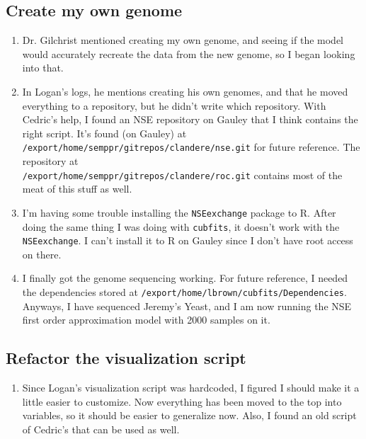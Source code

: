 \documentclass[12 pt]{article}
\begin{document}
 		\subsection{Create my own genome}
 		\begin{enumerate}
 			\item Dr. Gilchrist mentioned creating my own genome, and seeing if the model would accurately recreate the data from the new genome, so I began looking into that.
 			\item In Logan's logs, he mentions creating his own genomes, and that he moved everything to a repository, but he didn't write which repository. With Cedric's help, I found an NSE repository on Gauley that I think contains the right script. It's found (on Gauley) at \\
 			\texttt{/export/home/semppr/gitrepos/clandere/nse.git} for future reference. The repository at \\
 			\texttt{/export/home/semppr/gitrepos/clandere/roc.git} contains most of the meat of this stuff as well.
 			\item I'm having some trouble installing the \texttt{NSEexchange} package to R. After doing the same thing I was doing with \texttt{cubfits}, it doesn't work with the \texttt{NSEexchange}. I can't install it to R on Gauley since I don't have root access on there.
 			\item I finally got the genome sequencing working. For future reference, I needed the dependencies stored at \texttt{/export/home/lbrown/cubfits/Dependencies}. Anyways, I have sequenced Jeremy's Yeast, and I am now running the NSE first order approximation model with 2000 samples on it.
 		\end{enumerate}
 		
 		\subsection{Refactor the visualization script}
 		\begin{enumerate}
 			\item Since Logan's visualization script was hardcoded, I figured I should make it a little easier to customize. Now everything has been moved to the top into variables, so it should be easier to generalize now. Also, I found an old script of Cedric's that can be used as well.
 		\end{enumerate}
 			
\end{document}
